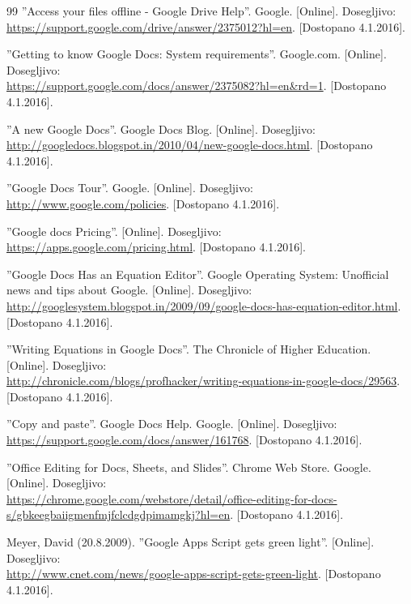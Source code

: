 \documentclass[a4paper, 12pt]{book}
\begin{document}
\begin{thebibliography}{99}
 ''Access your files offline - Google Drive Help''. Google.
[Online]. Dosegljivo:\\ 
\url{https://support.google.com/drive/answer/2375012?hl=en}.
[Dostopano 4.1.2016].

 ''Getting to know Google Docs: System requirements''. Google.com. 
[Online]. Dosegljivo:\\ 
\url{https://support.google.com/docs/answer/2375082?hl=en\&rd=1}.
[Dostopano 4.1.2016].

 ''A new Google Docs''. Google Docs Blog. 
[Online]. Dosegljivo:\\ 
\url{http://googledocs.blogspot.in/2010/04/new-google-docs.html}.
[Dostopano 4.1.2016].

 ''Google Docs Tour''. Google.
[Online]. Dosegljivo:\\ 
\url{http://www.google.com/policies}.
[Dostopano 4.1.2016].


 ''Google docs Pricing''. 
[Online]. Dosegljivo:\\ 
\url{https://apps.google.com/pricing.html}.
[Dostopano 4.1.2016].


 ''Google Docs Has an Equation Editor''. Google Operating System: Unofficial news and tips about Google. 
[Online]. Dosegljivo:\\ 
\url{http://googlesystem.blogspot.in/2009/09/google-docs-has-equation-editor.html}.
[Dostopano 4.1.2016].

 ''Writing Equations in Google Docs''. The Chronicle of Higher Education.
[Online]. Dosegljivo:\\ 
\url{http://chronicle.com/blogs/profhacker/writing-equations-in-google-docs/29563}.
[Dostopano 4.1.2016].


 ''Copy and paste''. Google Docs Help. Google. 
[Online]. Dosegljivo:\\ 
\url{https://support.google.com/docs/answer/161768}.
[Dostopano 4.1.2016].

 ''Office Editing for Docs, Sheets, and Slides''. Chrome Web Store. Google.
[Online]. Dosegljivo:\\ \url{https://chrome.google.com/webstore/detail/office-editing-for-docs-s/gbkeegbaiigmenfmjfclcdgdpimamgkj?hl=en}.
[Dostopano 4.1.2016].


 Meyer, David (20.8.2009). ''Google Apps Script gets green light''.
[Online]. Dosegljivo:\\ 
\url{http://www.cnet.com/news/google-apps-script-gets-green-light}.
[Dostopano 4.1.2016].



\end{thebibliography}
\end{document}
